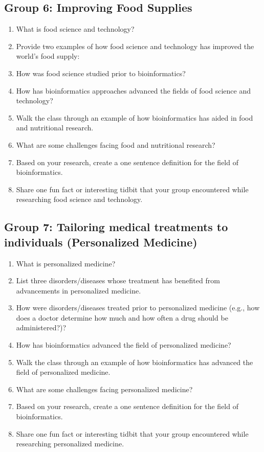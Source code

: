 \subsection*{Group 6: Improving Food Supplies}
\begin{enumerate}
	\item What is food science and technology?
	\item Provide two examples of how food science and technology has improved the world's food supply:
	\item How was food science studied prior to bioinformatics?
	\item How has bioinformatics approaches advanced the fields of food science and technology?
	\item Walk the class through an example of how bioinformatics has aided in food and nutritional research.
	\item What are some challenges facing food and nutritional research?
	\item Based on your research, create a one sentence definition for the field of bioinformatics.
	\item Share one fun fact or interesting tidbit that your group encountered while researching food science and technology.
\end{enumerate}

\subsection*{Group 7: Tailoring medical treatments to individuals (Personalized Medicine)}
\begin{enumerate}
	\item What is personalized medicine?
	\item List three disorders/diseases whose treatment has benefited from advancements in personalized medicine.
	\item How were disorders/diseases treated prior to personalized medicine (e.g., how does a doctor	determine how much and how often a drug should be administered?)?
	\item How has bioinformatics advanced the field of personalized medicine?
	\item Walk the class through an example of how bioinformatics has advanced the field of personalized medicine.
	\item What are some challenges facing personalized medicine?
	\item Based on your research, create a one sentence definition for the field of bioinformatics.
	\item Share one fun fact or interesting tidbit that your group encountered while researching personalized medicine.
\end{enumerate}

